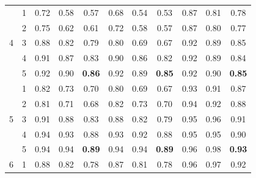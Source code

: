 \documentclass[12pt]{article}
\begin{document}
\begin{table}[H]
\begin{tabular}{rrrrrrrrrrr}
            \hline
            \multicolumn{1}{c}{\multirow{5}{*}{4}} & \multicolumn{1}{c}{1}& 0.72 & 0.58 & \multicolumn{1}{c}{0.57}& 0.68 & 0.54 & \multicolumn{1}{c}{0.53}& 0.87 & 0.81 & \multicolumn{1}{c}{0.78} \\
            \multicolumn{1}{c}{} & \multicolumn{1}{c}{2}& 0.75 & 0.62 & \multicolumn{1}{c}{0.61} & 0.72 & 0.58 & \multicolumn{1}{c}{0.57} & 0.87 & 0.80 & \multicolumn{1}{c}{0.77}   \\
            \multicolumn{1}{c}{} & \multicolumn{1}{c}{3}& 0.88 & 0.82 & \multicolumn{1}{c}{0.79} & 0.80 & 0.69 & \multicolumn{1}{c}{0.67} & 0.92 & 0.89 & \multicolumn{1}{c}{0.85}   \\
            \multicolumn{1}{c}{} & \multicolumn{1}{c}{4}& 0.91 & 0.87 & \multicolumn{1}{c}{0.83} & 0.90 & 0.86 & \multicolumn{1}{c}{0.82} & 0.92 & 0.89 & \multicolumn{1}{c}{0.84}   \\
            \multicolumn{1}{c}{} & \multicolumn{1}{c}{5}& 0.92 & 0.90 & \multicolumn{1}{c}{\textbf{0.86}} & 0.92 & 0.89 & \multicolumn{1}{c}{\textbf{0.85}} & 0.92 & 0.90 & \multicolumn{1}{c}{\textbf{0.85}} \\
            \hline
            \multicolumn{1}{c}{\multirow{5}{*}{5}} & \multicolumn{1}{c}{1}& 0.82 & 0.73 & \multicolumn{1}{c}{0.70} & 0.80 & 0.69 & \multicolumn{1}{c}{0.67} & 0.93 & 0.91 & \multicolumn{1}{c}{0.87} \\
            \multicolumn{1}{c}{} & \multicolumn{1}{c}{2}& 0.81 & 0.71 & \multicolumn{1}{c}{0.68} & 0.82 & 0.73 & \multicolumn{1}{c}{0.70} & 0.94 & 0.92 & \multicolumn{1}{c}{0.88} \\
            \multicolumn{1}{c}{} & \multicolumn{1}{c}{3}& 0.91 & 0.88 & \multicolumn{1}{c}{0.83} & 0.88 & 0.82 & \multicolumn{1}{c}{0.79} & 0.95 & 0.96 & \multicolumn{1}{c}{0.91} \\
            \multicolumn{1}{c}{} & \multicolumn{1}{c}{4}& 0.94 & 0.93 & \multicolumn{1}{c}{0.88} & 0.93 & 0.92 & \multicolumn{1}{c}{0.88} & 0.95 & 0.95 & \multicolumn{1}{c}{0.90}  \\
            \multicolumn{1}{c}{} & \multicolumn{1}{c}{5}& 0.94 & 0.94 & \multicolumn{1}{c}{\textbf{0.89}} & 0.94 & 0.94 & \multicolumn{1}{c}{\textbf{0.89}} & 0.96 & 0.98 & \multicolumn{1}{c}{\textbf{0.93}}  \\
            \hline
            \multicolumn{1}{c}{\multirow{5}{*}{6}} & \multicolumn{1}{c}{1}& 0.88 & 0.82 & \multicolumn{1}{c}{0.78} & 0.87 & 0.81 & \multicolumn{1}{c}{0.78} & 0.96 & 0.97 & \multicolumn{1}{c}{0.92}  \\

\end{tabular}
\end{table}
\end{document}

